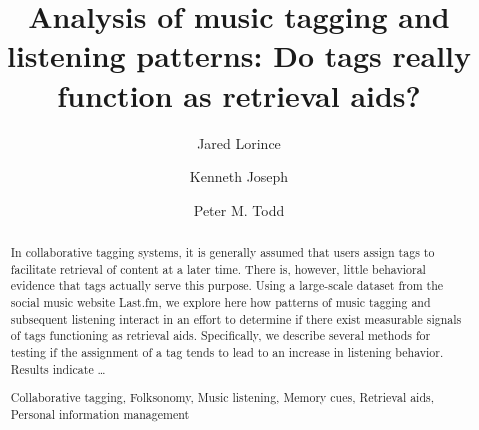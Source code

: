 \documentclass[runningheads,a4paper]{llncs}
\newcommand{\keywords}[1]{\par\addvspace\baselineskip
\noindent\keywordname\enspace\ignorespaces#1}
\begin{document}
\mainmatter  %

\title{Analysis of music tagging and listening patterns: Do tags really function as retrieval aids?}



%
%
\author{Jared Lorince%
\and Kenneth Joseph \and Peter M. Todd}
%


%
%

\maketitle

\begin{abstract}
In collaborative tagging systems, it is generally assumed that users assign tags to facilitate retrieval of content at a later time. There is, however, little behavioral evidence that tags actually serve this purpose. Using a large-scale dataset from the social music website Last.fm, we explore here how patterns of music tagging and subsequent listening interact in an effort to determine if there exist measurable signals of tags functioning as retrieval aids. Specifically, we describe several methods for testing if the assignment of a tag tends to lead to an increase in listening behavior. Results indicate \ldots
\keywords{Collaborative tagging, Folksonomy, Music listening, Memory cues, Retrieval aids, Personal information management}
\end{abstract}
\setcounter{footnote}{0}









\end{document}
